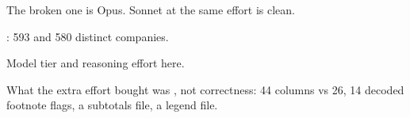 \begin{frame}{The broken one is Opus. Sonnet at the same effort is clean.}
\begin{wideitemize}
  \item {}: 593 and 580 distinct companies.
  \item Model tier and reasoning effort  here.
  \item What the extra effort bought was , not correctness: 44 columns
        vs 26, 14 decoded footnote flags, a subtotals file, a legend file.
\end{wideitemize}
\end{frame}
